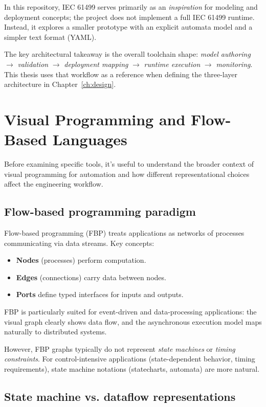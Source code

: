 In this repository, IEC 61499 serves primarily as an \emph{inspiration} for modeling and deployment concepts; the project does not implement a full IEC 61499 runtime.
Instead, it explores a smaller prototype with an explicit automata model and a simpler text format (YAML).

The key architectural takeaway is the overall toolchain shape: \emph{model authoring} $\rightarrow$ \emph{validation} $\rightarrow$ \emph{deployment mapping} $\rightarrow$ \emph{runtime execution} $\rightarrow$ \emph{monitoring}.
This thesis uses that workflow as a reference when defining the three-layer architecture in Chapter~\ref{ch:design}.

\section{Visual Programming and Flow-Based Languages}

Before examining specific tools, it's useful to understand the broader context of visual programming for automation and how different representational choices affect the engineering workflow.

\subsection{Flow-based programming paradigm}

Flow-based programming (FBP) treats applications as networks of processes communicating via data streams.
Key concepts:
\begin{itemize}
  \item \textbf{Nodes} (processes) perform computation.
  \item \textbf{Edges} (connections) carry data between nodes.
  \item \textbf{Ports} define typed interfaces for inputs and outputs.
\end{itemize}

FBP is particularly suited for event-driven and data-processing applications: the visual graph clearly shows data flow, and the asynchronous execution model maps naturally to distributed systems.

However, FBP graphs typically do not represent \emph{state machines} or \emph{timing constraints}.
For control-intensive applications (state-dependent behavior, timing requirements), state machine notations (statecharts, automata) are more natural.

\subsection{State machine vs. dataflow representations}

